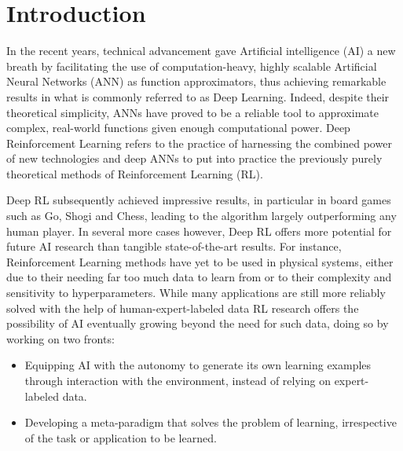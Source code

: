 \section{Introduction}

In the recent years, technical advancement gave Artificial intelligence (AI) a new breath by facilitating the use of computation-heavy, highly scalable Artificial Neural Networks (ANN) as function approximators, thus achieving remarkable results in what is commonly referred to as Deep Learning. Indeed, despite their theoretical simplicity, ANNs have proved to be a reliable tool to approximate complex, real-world functions given enough computational power. Deep Reinforcement Learning refers to the practice of harnessing the combined power of new technologies and deep ANNs to put into practice the previously purely theoretical methods of Reinforcement Learning (RL). 

Deep RL subsequently achieved impressive results, in particular in board games such as Go, Shogi and Chess, leading to the algorithm largely outperforming any human player. In several more cases however, Deep RL offers more potential for future AI research than tangible state-of-the-art results. For instance, Reinforcement Learning methods have yet to be used in physical systems, either due to their needing far too much data to learn from %
or to their complexity and sensitivity to hyperparameters. %
While many applications are still more reliably solved with the help of human-expert-labeled data %
RL research offers the possibility of AI eventually growing beyond the need for such data, doing so by working on two fronts:
\begin{itemize}
\item Equipping AI with the autonomy to generate its own learning examples through interaction with the environment, instead of relying on expert-labeled data.
\item Developing a meta-paradigm that solves the problem of learning, irrespective of the task or application to be learned.
\end{itemize}
